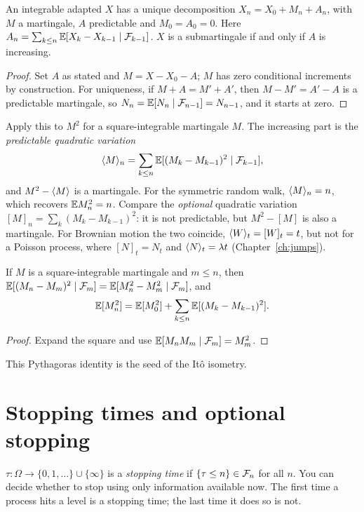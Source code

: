 \begin{theorem}\label{thm:doobdec}
An integrable adapted $X$ has a unique decomposition $X_n=X_0+M_n+A_n$, with $M$ a martingale, $A$ predictable and $M_0=A_0=0$. Here $A_n=\sum_{k\le n}\mathbb{E}[X_k-X_{k-1}\mid\mathcal{F}_{k-1}]$. $X$ is a submartingale if and only if $A$ is increasing.
\end{theorem}
\begin{proof}
Set $A$ as stated and $M=X-X_0-A$; $M$ has zero conditional increments by construction. For uniqueness, if $M+A=M'+A'$, then $M-M'=A'-A$ is a predictable martingale, so $N_n=\mathbb{E}[N_n\mid\mathcal{F}_{n-1}]=N_{n-1}$, and it starts at zero.
\end{proof}

Apply this to $M^2$ for a square-integrable martingale $M$. The increasing part is the \emph{predictable quadratic variation}
\[
\langle M\rangle_n=\sum_{k\le n}\mathbb{E}[(M_k-M_{k-1})^2\mid\mathcal{F}_{k-1}],
\]
and $M^2-\langle M\rangle$ is a martingale. For the symmetric random walk, $\langle M\rangle_n=n$, which recovers $\mathbb{E} M_n^2=n$. Compare the \emph{optional} quadratic variation $[M]_n=\sum_k(M_k-M_{k-1})^2$: it is not predictable, but $M^2-[M]$ is also a martingale. For Brownian motion the two coincide, $\langle W\rangle_t=[W]_t=t$, but not for a Poisson process, where $[N]_t=N_t$ and $\langle N\rangle_t=\lambda t$ (Chapter~\ref{ch:jumps}).

\begin{proposition}\label{prop:orth}
If $M$ is a square-integrable martingale and $m\le n$, then $\mathbb{E}[(M_n-M_m)^2\mid\mathcal{F}_m]=\mathbb{E}[M_n^2-M_m^2\mid\mathcal{F}_m]$, and
\[
\mathbb{E}[M_n^2]=\mathbb{E}[M_0^2]+\sum_{k\le n}\mathbb{E}[(M_k-M_{k-1})^2].
\]
\end{proposition}
\begin{proof}
Expand the square and use $\mathbb{E}[M_nM_m\mid\mathcal{F}_m]=M_m^2$.
\end{proof}

This Pythagoras identity is the seed of the It\^o isometry.

\section{Stopping times and optional stopping}

\begin{definition}
$\tau:\Omega\to\{0,1,\dots\}\cup\{\infty\}$ is a \emph{stopping time} if $\{\tau\le n\}\in\mathcal{F}_n$ for all $n$. You can decide whether to stop using only information available now. The first time a process hits a level is a stopping time; the last time it does so is not.
\end{definition}

